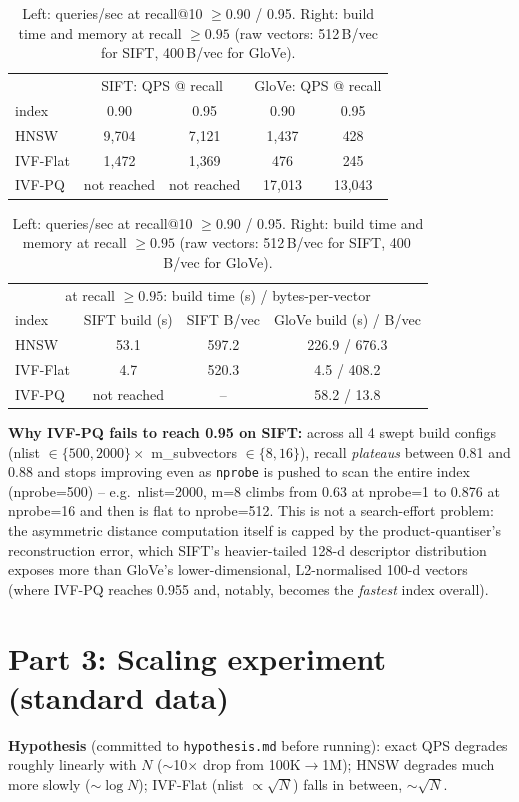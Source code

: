 \documentclass[10pt]{article}
\begin{document}
\begin{table}[H]
\centering\small
\begin{tabular}{l c c c c}
\toprule
 & \multicolumn{2}{c}{SIFT: QPS @ recall} & \multicolumn{2}{c}{GloVe: QPS @ recall} \\
index & 0.90 & 0.95 & 0.90 & 0.95 \\
\midrule
HNSW     & 9{,}704 & 7{,}121  & 1{,}437 & 428 \\
IVF-Flat & 1{,}472 & 1{,}369  & 476   & 245 \\
IVF-PQ   & not reached & not reached & 17{,}013 & 13{,}043 \\
\bottomrule
\end{tabular}
\hspace{0.5cm}
\begin{tabular}{l c c c}
\toprule
\multicolumn{4}{c}{at recall $\geq 0.95$: build time (s) / bytes-per-vector} \\
index & SIFT build (s) & SIFT B/vec & GloVe build (s) / B/vec \\
\midrule
HNSW     & 53.1 & 597.2 & 226.9 / 676.3 \\
IVF-Flat & 4.7  & 520.3 & 4.5 / 408.2 \\
IVF-PQ   & not reached & -- & 58.2 / 13.8 \\
\bottomrule
\end{tabular}
\caption{Left: queries/sec at recall@10 $\geq$0.90 / 0.95. Right: build time and memory at recall $\geq 0.95$ (raw vectors: 512\,B/vec for SIFT, 400\,B/vec for GloVe).}
\end{table}

\textbf{Why IVF-PQ fails to reach 0.95 on SIFT:} across all 4 swept build configs
(nlist $\in\{500,2000\}\times$ m\_subvectors $\in\{8,16\}$), recall \emph{plateaus} between 0.81
and 0.88 and stops improving even as \texttt{nprobe} is pushed to scan the entire index
(nprobe=500) -- e.g.\ nlist=2000, m=8 climbs from 0.63 at nprobe=1 to 0.876 at nprobe=16 and then
is flat to nprobe=512. This is not a search-effort problem: the asymmetric distance computation
itself is capped by the product-quantiser's reconstruction error, which SIFT's heavier-tailed
128-d descriptor distribution exposes more than GloVe's lower-dimensional, L2-normalised
100-d vectors (where IVF-PQ reaches 0.955 and, notably, becomes the \emph{fastest} index overall).

\section*{Part 3: Scaling experiment (standard data)}
\textbf{Hypothesis} (committed to \texttt{hypothesis.md} before running): exact QPS degrades
roughly linearly with $N$ ($\sim$10$\times$ drop from 100K$\to$1M); HNSW degrades much more
slowly ($\sim\log N$); IVF-Flat (nlist $\propto\sqrt{N}$) falls in between, $\sim\sqrt{N}$.
\end{document}
